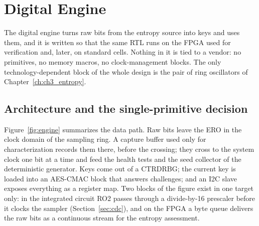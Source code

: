 \chapter{Digital Engine}
\label{ch:ch4_engine}


The digital engine turns raw bits from the entropy source into keys and
uses them, and it is written so that the same \ac{RTL} runs on the FPGA
used for verification and, later, on standard cells. Nothing in it is
tied to a vendor: no primitives, no memory macros, no clock-management
blocks. The only technology-dependent block of the whole design is the
pair of ring oscillators of Chapter~\ref{ch:ch3_entropy}.

\section{Architecture and the single-primitive decision}
\label{sec:arch}

Figure~\ref{fig:engine} summarizes the data path. Raw bits leave the
\ac{ERO} in the clock domain of the sampling ring. A capture buffer used
only for characterization records them there, before the crossing; they
cross to the system clock one bit at a time and feed the health tests
and the seed collector of the deterministic generator. Keys come out of
a \ac{CTRDRBG}; the current
key is loaded into an AES-CMAC block that answers challenges; and an
\ac{I2C} slave exposes everything as a register map. Two blocks of the
figure exist in one target only: in the integrated circuit RO2 passes
through a divide-by-16 prescaler before it clocks the sampler
(Section~\ref{sec:cdc}), and on the \ac{FPGA} a byte queue delivers the
raw bits as a continuous stream for the entropy assessment.

